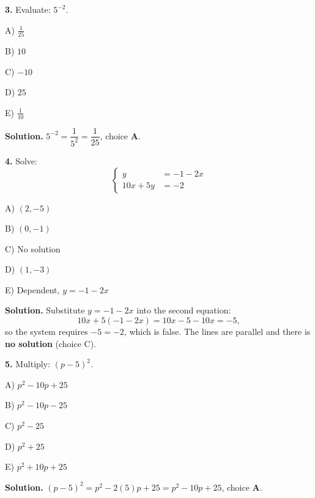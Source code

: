 \documentclass{ximera}
\begin{document}
\begin{problem}

\textbf{3.} Evaluate: $5^{-2}$.



A) $\frac{1}{25}$

B) $10$

C) $-10$

D) $25$

E) $\frac{1}{10}$

\begin{hint}
\textbf{Solution.} $5^{-2}=\dfrac{1}{5^{2}}=\dfrac{1}{25}$, choice \textbf{A}.
\end{hint}
\end{problem}

\begin{problem}

\textbf{4.} Solve:
\[
  \left\{\begin{aligned}
    y &= -1-2x \\
    10x+5y &= -2
  \end{aligned}\right.
\]



A) $(2,-5)$

B) $(0,-1)$

C) No solution

D) $(1,-3)$

E) Dependent, $y=-1-2x$

\begin{hint}
\textbf{Solution.} Substitute $y=-1-2x$ into the second equation:
\[
  10x+5(-1-2x) = 10x-5-10x = -5,
\]
so the system requires $-5=-2$, which is false. The lines are parallel and there is
\textbf{no solution} (choice C).
\end{hint}
\end{problem}

\begin{problem}

\textbf{5.} Multiply: $(p-5)^{2}$.



A) $p^{2}-10p+25$

B) $p^{2}-10p-25$

C) $p^{2}-25$

D) $p^{2}+25$

E) $p^{2}+10p+25$

\begin{hint}
\textbf{Solution.} $(p-5)^{2}=p^{2}-2(5)p+25=p^{2}-10p+25$, choice \textbf{A}.
\end{hint}
\end{problem}
\end{document}
